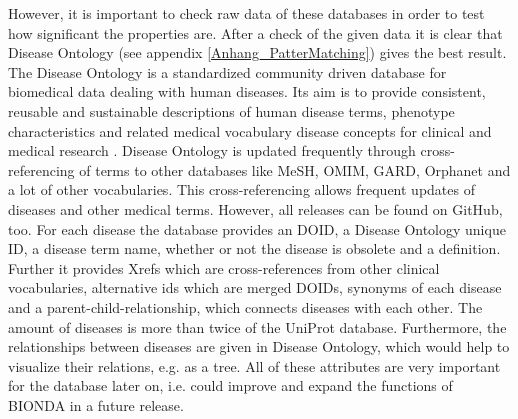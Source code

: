 However, it is important to check raw data of these databases in order to test how significant the properties are. After a check of the given data it is clear that Disease Ontology (see appendix \ref{Anhang_PatterMatching}) gives the best result. The Disease Ontology is a standardized community driven database for biomedical data dealing with human diseases. Its aim is to provide consistent, reusable and sustainable descriptions of human disease terms, phenotype characteristics and related medical vocabulary disease concepts for clinical and medical research \citep{do}. Disease Ontology is updated frequently through cross-referencing of terms to other databases like \ac{MeSH}, \ac{OMIM}, \ac{GARD}, Orphanet and a lot of other vocabularies. This cross-referencing allows frequent updates of diseases and other medical terms. However, all releases can be found on GitHub, too. For each disease the database provides an DOID, a Disease Ontology unique ID, a disease term name, whether or not the disease is obsolete and a definition. Further it provides Xrefs which are cross-references from other clinical vocabularies, alternative ids which are merged DOIDs, synonyms of each disease and a parent-child-relationship, which connects diseases with each other. The amount of diseases is more than twice  of the \ac{UniProt} database. Furthermore, the relationships between diseases are given in Disease Ontology, which would help to visualize their relations, e.g. as a tree. All of these attributes are very important for the database later on, i.e. could improve and expand the functions of \ac{BIONDA} in a future release. \\

